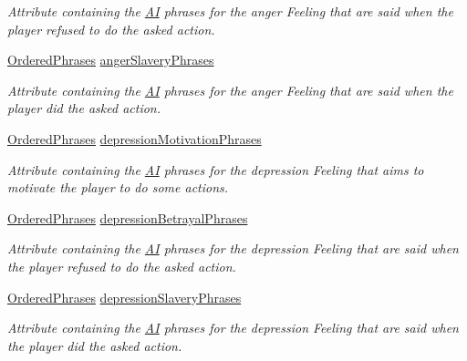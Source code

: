 \begin{DoxyCompactItemize}
\begin{DoxyCompactList}\small\item\em Attribute containing the \hyperlink{classgameplay_1_1ai_1_1_a_i}{A\-I} phrases for the anger Feeling that are said when the player refused to do the asked action. \end{DoxyCompactList}\item 
\hyperlink{classgameplay_1_1ai_1_1phrasing_1_1_ordered_phrases}{Ordered\-Phrases} \hyperlink{classgameplay_1_1ai_1_1phrasing_1_1_phrasing_a1c50856055990e9a1c22fd2b364bdf85}{anger\-Slavery\-Phrases}
\begin{DoxyCompactList}\small\item\em Attribute containing the \hyperlink{classgameplay_1_1ai_1_1_a_i}{A\-I} phrases for the anger Feeling that are said when the player did the asked action. \end{DoxyCompactList}\item 
\hyperlink{classgameplay_1_1ai_1_1phrasing_1_1_ordered_phrases}{Ordered\-Phrases} \hyperlink{classgameplay_1_1ai_1_1phrasing_1_1_phrasing_a7134cba12ee037a9737e6e5dcdc02ba8}{depression\-Motivation\-Phrases}
\begin{DoxyCompactList}\small\item\em Attribute containing the \hyperlink{classgameplay_1_1ai_1_1_a_i}{A\-I} phrases for the depression Feeling that aims to motivate the player to do some actions. \end{DoxyCompactList}\item 
\hyperlink{classgameplay_1_1ai_1_1phrasing_1_1_ordered_phrases}{Ordered\-Phrases} \hyperlink{classgameplay_1_1ai_1_1phrasing_1_1_phrasing_a1ab28780f3cb894c496ebd26185493aa}{depression\-Betrayal\-Phrases}
\begin{DoxyCompactList}\small\item\em Attribute containing the \hyperlink{classgameplay_1_1ai_1_1_a_i}{A\-I} phrases for the depression Feeling that are said when the player refused to do the asked action. \end{DoxyCompactList}\item 
\hyperlink{classgameplay_1_1ai_1_1phrasing_1_1_ordered_phrases}{Ordered\-Phrases} \hyperlink{classgameplay_1_1ai_1_1phrasing_1_1_phrasing_ab8f4fdd33f163351fb6ff578cb950a44}{depression\-Slavery\-Phrases}
\begin{DoxyCompactList}\small\item\em Attribute containing the \hyperlink{classgameplay_1_1ai_1_1_a_i}{A\-I} phrases for the depression Feeling that are said when the player did the asked action. \end{DoxyCompactList}\item 

\end{DoxyCompactItemize}
